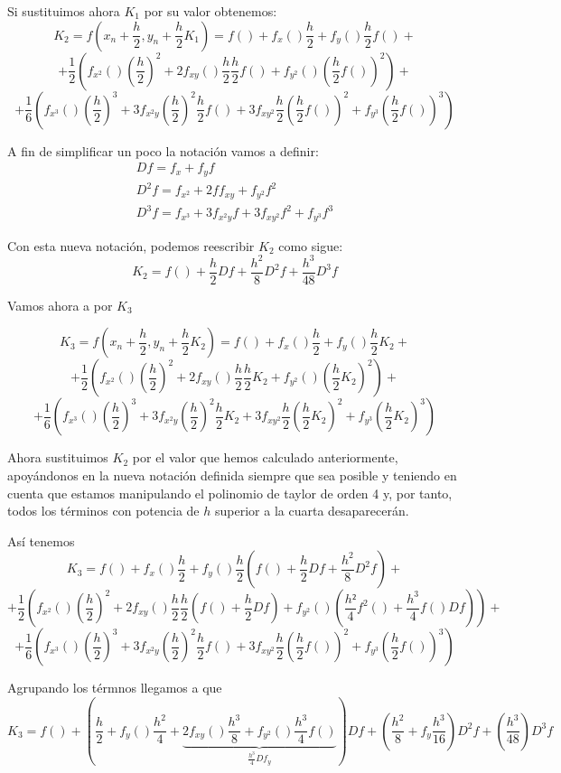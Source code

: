 \documentclass[nochap]{apuntes}
\begin{document}
Si sustituimos ahora $K_1$ por su valor obtenemos:
\[K_2 = f\left(x_n+\frac{h}{2},y_n+\frac{h}{2}K_1\right)=f()+f_x()\frac{h}{2}+f_y()\frac{h}{2}f() +\]
\[+ \frac{1}{2}\left( f_{x^2}()\left(\frac{h}{2}\right)^2 +2 f_{xy}()\frac{h}{2}\frac{h}{2}f() +f_{y^2}()\left(\frac{h}{2}f()\right)^2\right) +\]
\[+   \frac{1}{6}\left( f_{x^3}()\left(\frac{h}{2}\right)^3 + 3f_{x^2y}\left(\frac{h}{2}\right)^2\frac{h}{2}f() + 3f_{xy^2}\frac{h}{2}\left(\frac{h}{2}f()\right)^2 + f_{y^3}\left(\frac{h}{2}f()\right)^3\right)\]

A fin de simplificar un poco la notación vamos a definir:
\[\begin{array}{l}
Df = f_x+f_yf\\
D^2f = f_{x^2}+2ff_{xy}+f_{y^2}f^2\\
D^3f = f_{x^3} + 3f_{x^2y}f + 3f_{xy^2}f^2 + f_{y^3}f^3
\end{array}\]

Con esta nueva notación, podemos reescribir $K_2$ como sigue:
\[K_2 = f() + \frac{h}{2}Df + \frac{h^2}{8}D^2f + \frac{h^3}{48}D^3f\]

Vamos ahora a por $K_3$

\[K_3 = f\left(x_n+\frac{h}{2},y_n+\frac{h}{2}K_2\right)=f()+f_x()\frac{h}{2}+f_y()\frac{h}{2}K_2 +\]
\[+ \frac{1}{2}\left( f_{x^2}()\left(\frac{h}{2}\right)^2 +2 f_{xy}()\frac{h}{2}\frac{h}{2}K_2 +f_{y^2}()\left(\frac{h}{2}K_2\right)^2\right) +\]
\[+   \frac{1}{6}\left( f_{x^3}()\left(\frac{h}{2}\right)^3 + 3f_{x^2y}\left(\frac{h}{2}\right)^2\frac{h}{2}K_2 + 3f_{xy^2}\frac{h}{2}\left(\frac{h}{2}K_2\right)^2 + f_{y^3}\left(\frac{h}{2}K_2\right)^3\right)\]

Ahora sustituimos $K_2$ por el valor que hemos calculado anteriormente, apoyándonos en la nueva notación definida siempre que sea posible y teniendo en cuenta que estamos manipulando el polinomio de taylor de orden 4 y, por tanto, todos los términos con potencia de $h$ superior a la cuarta desaparecerán.

Así tenemos
\[K_3 =f()+f_x()\frac{h}{2}+f_y()\frac{h}{2}\left( f()+\frac{h}{2}Df + \frac{h^2}{8}D^2f\right) +\]
\[+ \frac{1}{2}\left( f_{x^2}()\left(\frac{h}{2}\right)^2 +2 f_{xy}()\frac{h}{2}\frac{h}{2}\left(f() + \frac{h}{2}Df \right) +f_{y^2}()\left(\frac{h²}{4}f^2()+\frac{h^3}{4}f()Df\right)\right) +\]
\[+\frac{1}{6}\left( f_{x^3}()\left(\frac{h}{2}\right)^3 + 3f_{x^2y}\left(\frac{h}{2}\right)^2\frac{h}{2}f()+ 3f_{xy^2}\frac{h}{2}\left(\frac{h}{2}f()\right)^2 + f_{y^3}\left(\frac{h}{2}f()\right)^3\right)\]

Agrupando los térmnos llegamos a que
\[K_3 = f()+\left(\frac{h}{2}+f_y()\frac{h^2}{4}+\underbrace{2f_{xy}()\frac{h^3}{8}+f_{y^2}()\frac{h^3}{4}f()}_{\frac{h^3}{4}Df_y}\right)Df+\left(\frac{h^2}{8} + f_y\frac{h^3}{16}\right)D^2f +\left(\frac{h^3}{48}\right)D^3f\]
\end{document}
